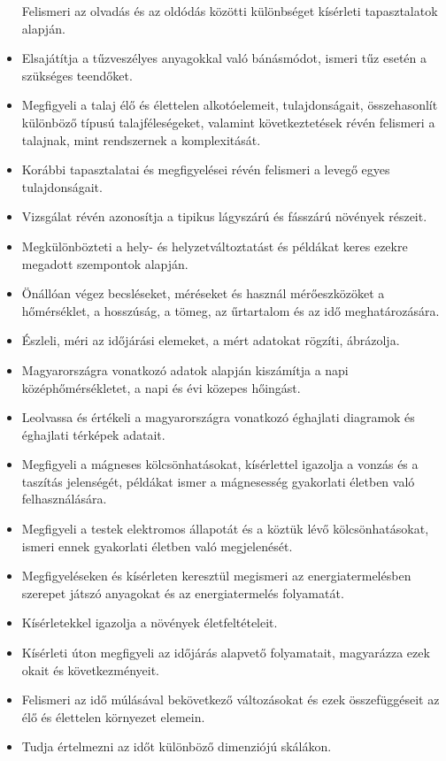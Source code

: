 \begin{itemize}
  Felismeri az olvadás és az oldódás közötti különbséget kísérleti
  tapasztalatok alapján.
\item
  Elsajátítja a tűzveszélyes anyagokkal való bánásmódot, ismeri tűz
  esetén a szükséges teendőket.
\item
  Megfigyeli a talaj élő és élettelen alkotóelemeit, tulajdonságait,
  összehasonlít különböző típusú talajféleségeket, valamint
  következtetések révén felismeri a talajnak, mint rendszernek a
  komplexitását.
\item
  Korábbi tapasztalatai és megfigyelései révén felismeri a levegő egyes
  tulajdonságait.
\item
  Vizsgálat révén azonosítja a tipikus lágyszárú és fásszárú növények
  részeit.
\item
  Megkülönbözteti a hely- és helyzetváltoztatást és példákat keres
  ezekre megadott szempontok alapján.
\item
  Önállóan végez becsléseket, méréseket és használ mérőeszközöket a
  hőmérséklet, a hosszúság, a tömeg, az űrtartalom és az idő
  meghatározására.
\item
  Észleli, méri az időjárási elemeket, a mért adatokat rögzíti,
  ábrázolja.
\item
  Magyarországra vonatkozó adatok alapján kiszámítja a napi
  középhőmérsékletet, a napi és évi közepes hőingást.
\item
  Leolvassa és értékeli a magyarországra vonatkozó éghajlati diagramok
  és éghajlati térképek adatait.
\item
  Megfigyeli a mágneses kölcsönhatásokat, kísérlettel igazolja a vonzás
  és a taszítás jelenségét, példákat ismer a mágnesesség gyakorlati
  életben való felhasználására.
\item
  Megfigyeli a testek elektromos állapotát és a köztük lévő
  kölcsönhatásokat, ismeri ennek gyakorlati életben való megjelenését.
\item
  Megfigyeléseken és kísérleten keresztül megismeri az
  energiatermelésben szerepet játszó anyagokat és az energiatermelés
  folyamatát.
\item
  Kísérletekkel igazolja a növények életfeltételeit.
\item
  Kísérleti úton megfigyeli az időjárás alapvető folyamatait, magyarázza
  ezek okait és következményeit.
\item
  Felismeri az idő múlásával bekövetkező változásokat és ezek
  összefüggéseit az élő és élettelen környezet elemein.
\item
  Tudja értelmezni az időt különböző dimenziójú skálákon.

\end{itemize}
